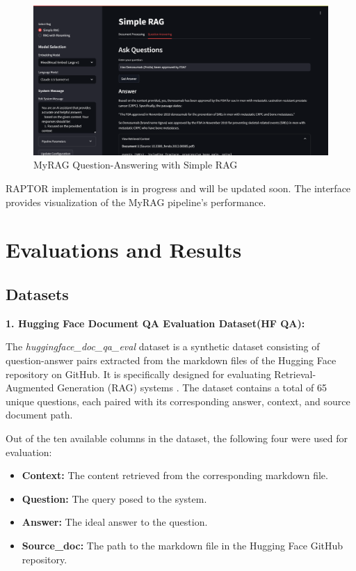 \documentclass{scrartcl}
\begin{document}
\begin{figure}[H]
    \centering
    \includegraphics[width=\textwidth]{MyRAG_UI_QA.png}
    \caption{MyRAG Question-Answering with Simple RAG}
    \label{fig:qa_interface}
\end{figure}

 RAPTOR implementation is in progress and will be updated soon. The interface provides visualization of the MyRAG pipeline's performance.

\section{Evaluations and Results}

\subsection{Datasets}

\textbf{1. Hugging Face Document QA Evaluation Dataset(HF QA):}

The \textit{huggingface\_doc\_qa\_eval} dataset is a synthetic dataset consisting of question-answer pairs extracted from the markdown files of the Hugging Face repository on GitHub. It is specifically designed for evaluating Retrieval-Augmented Generation (RAG) systems \cite{huggingface2024docqa}. The dataset contains a total of 65 unique questions, each paired with its corresponding answer, context, and source document path.

Out of the ten available columns in the dataset, the following four were used for evaluation:
\begin{itemize}
    \item \textbf{Context:} The content retrieved from the corresponding markdown file.
    \item \textbf{Question:} The query posed to the system.
    \item \textbf{Answer:} The ideal answer to the question.
    \item \textbf{Source\_doc:} The path to the markdown file in the Hugging Face GitHub repository.
\end{itemize}
\end{document}
